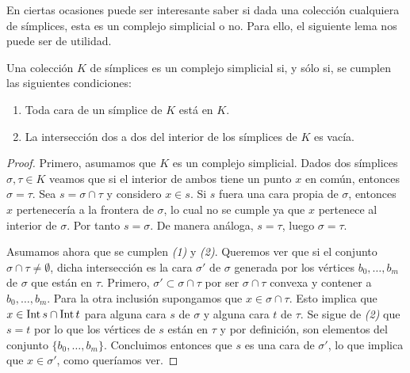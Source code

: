 En ciertas ocasiones puede ser interesante saber si dada una colección
cualquiera de símplices, esta es un complejo simplicial o no. Para ello, el siguiente
lema nos puede ser de utilidad.

\begin{lema}
	Una colección $K$ de símplices es un complejo simplicial si, y sólo si, se cumplen
	las siguientes condiciones:
	\begin{enumerate}
		\item Toda cara de un símplice de $K$ está en $K$.
		
		\item La intersección dos a dos del interior de los símplices de $K$ es vacía.
	\end{enumerate}
\end{lema}
\begin{proof}
	Primero, asumamos que $K$ es un complejo simplicial. Dados dos símplices $\sigma
	, \tau \in K$ veamos que si el interior de ambos tiene un punto $x$ en común,
	entonces $\sigma = \tau$. Sea $s = \sigma \cap \tau$ y considero $x \in s$. Si
	$s$ fuera una cara propia de $\sigma$, entonces $x$ pertenecería a la frontera
	de $\sigma$, lo cual no se cumple ya que $x$ pertenece al interior de $\sigma$.
	Por tanto $s = \sigma$. De manera análoga, $s = \tau$, luego $\sigma = \tau$.
	
	Asumamos ahora que se cumplen \textit{(1)} y \textit{(2)}. Queremos ver que si
	el conjunto $\sigma \cap \tau \neq \emptyset$, dicha intersección es la cara
	$\sigma'$ de $\sigma$ generada por los vértices $b_{0},\ldots,b_{m}$ de
	$\sigma$ que están en $\tau$. Primero, $\sigma' \subset \sigma \cap \tau$ por
	ser $\sigma \cap \tau$ convexa y contener a $b_{0}, \ldots, b_{m}$. Para la otra
	inclusión supongamos que $x \in \sigma \cap \tau$. Esto implica que
	$x \in \operatorname{Int} s \cap \operatorname{Int} t$ para alguna cara $s$ de $\sigma$ y alguna
	cara $t$ de $\tau$. Se sigue de \textit{(2)} que $s = t$ por lo que los
	vértices de $s$ están en $\tau$ y por definición, son elementos del conjunto $\{
	b_{0}, \ldots, b_{m}\}$. Concluimos entonces que $s$ es una cara de $\sigma'$,
	lo que implica que $x \in \sigma'$, como queríamos ver.
\end{proof}


